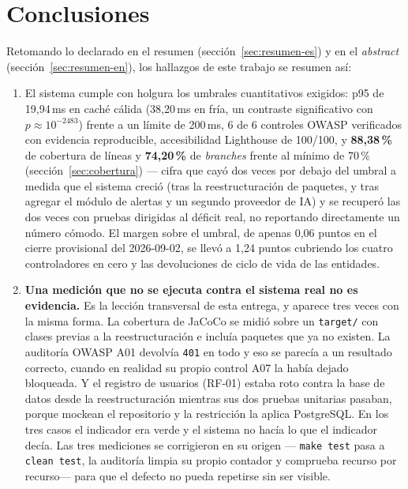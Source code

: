 \documentclass[11pt,a4paper]{article}
\begin{document}
\section{Conclusiones}

Retomando lo declarado en el resumen (sección~\ref{sec:resumen-es}) y en
el \emph{abstract} (sección~\ref{sec:resumen-en}), los hallazgos de este
trabajo se resumen así:

\begin{enumerate}[leftmargin=*]
  \item El sistema cumple con holgura los umbrales cuantitativos exigidos:
    p95 de 19,94\,ms en caché cálida (38,20\,ms en fría, un contraste
    significativo con $p \approx 10^{-2483}$) frente a un límite de
    200\,ms, 6 de 6 controles OWASP
    verificados con evidencia reproducible, accesibilidad Lighthouse de
    100/100, y \textbf{88,38\,\%} de cobertura de líneas y
    \textbf{74,20\,\%} de \emph{branches} frente al mínimo de 70\,\%
    (sección~\ref{sec:cobertura}) — cifra que cayó dos veces por debajo
    del umbral a medida que el sistema creció (tras la reestructuración
    de paquetes, y tras agregar el módulo de alertas y un segundo
    proveedor de IA) y se recuperó las dos veces con
    pruebas dirigidas al déficit real, no reportando directamente un
    número cómodo. El margen sobre el umbral, de apenas 0,06 puntos en
    el cierre provisional del 2026-09-02, se llevó a 1,24 puntos
    cubriendo los cuatro controladores en cero y las devoluciones de
    ciclo de vida de las entidades.

  \item \textbf{Una medición que no se ejecuta contra el sistema real no es
    evidencia.} Es la lección transversal de esta entrega, y aparece tres
    veces con la misma forma. La cobertura de JaCoCo se midió sobre un
    \texttt{target/} con clases previas a la reestructuración e incluía
    paquetes que ya no existen. La auditoría OWASP A01 devolvía
    \texttt{401} en todo y eso se parecía a un resultado correcto, cuando en
    realidad su propio control A07 la había dejado bloqueada. Y el registro
    de usuarios (RF-01) estaba roto contra la base de datos desde la
    reestructuración mientras sus dos pruebas unitarias pasaban, porque
    mockean el repositorio y la restricción la aplica PostgreSQL. En los
    tres casos el indicador era verde y el sistema no hacía lo que el
    indicador decía. Las tres mediciones se corrigieron en su origen —
    \texttt{make test} pasa a \texttt{clean test}, la auditoría limpia su
    propio contador y comprueba recurso por recurso— para que el defecto no
    pueda repetirse sin ser visible.


\end{enumerate}
\end{document}
